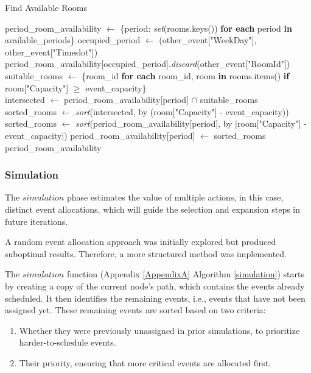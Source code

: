 \begin{algorithm}
\caption{Find Available Rooms}\label{find_available_rooms}
\begin{algorithmic}[1]
    \State period\_room\_availability $\gets$ \{period: \textit{set}(rooms.keys()) \textbf{for each} period \textbf{in} available\_periods\}
        \State occupied\_period $\gets$ (other\_event["WeekDay"], other\_event["Timeslot"])
            \State period\_room\_availability[occupied\_period].\textit{discard}(other\_event["RoomId"])
        \EndIf
    \EndFor
    \\
    \State suitable\_rooms $\gets$ \{room\_id \textbf{for each} room\_id, room \textbf{in} rooms.items() \textbf{if} room["Capacity"] $\geq$ event\_capacity\}
    \\
            \State intersected $\gets$ period\_room\_availability[period] $\cap$ suitable\_rooms
                \State sorted\_rooms $\gets$ \textit{sort}(intersected, by (room["Capacity"] - event\_capacity))
            \Else
                \State sorted\_rooms $\gets$ \textit{sort}(period\_room\_availability[period], by $|$room["Capacity"] - event\_capacity$|$)
            \EndIf
            \State period\_room\_availability[period] $\gets$ sorted\_rooms
        \EndIf
    \EndFor
    \\
    \State \Return period\_room\_availability
\EndFunction
\end{algorithmic}
\end{algorithm}

\subsubsection{Simulation}

The \(simulation\) phase estimates the value of multiple actions, in this case, distinct event allocations, which will guide the selection and expansion steps in future iterations. 

A random event allocation approach was initially explored but produced suboptimal results. Therefore, a more structured method was implemented.

The \(simulation\) function (Appendix \ref{AppendixA} Algorithm \ref{simulation}) starts by creating a copy of the current node's path, which contains the events already scheduled. It then identifies the remaining events, i.e., events that have not been assigned yet. These remaining events are sorted based on two criteria:
\begin{enumerate}
\item Whether they were previously unassigned in prior simulations, to prioritize harder-to-schedule events.
\item Their priority, ensuring that more critical events are allocated first.
\end{enumerate}

